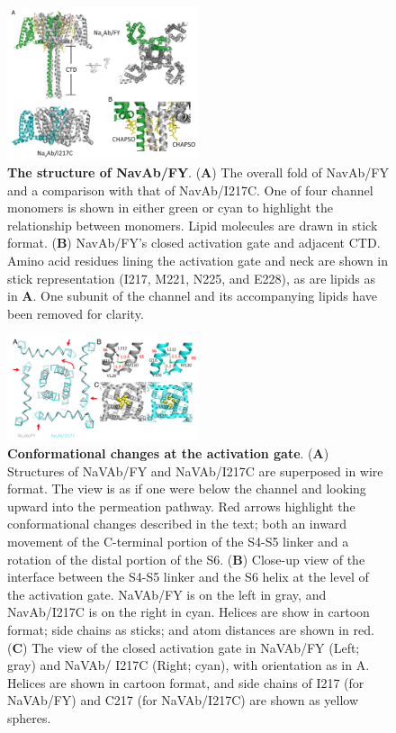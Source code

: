 \begin{refsection}
{\begin{figure}[!htb]
\centering
\includegraphics[width=0.5\textwidth]{navopen/NavOFig2}
\caption[The structure of NavAb/FY]{\textbf{The structure of NavAb/FY}. (\textbf{A})  The overall fold of NavAb/FY and a comparison with that of NavAb/I217C. One of four channel monomers is shown in either green or cyan to highlight the relationship between monomers. Lipid molecules are drawn in stick format. (\textbf{B}) NavAb/FY's closed activation gate and adjacent CTD. Amino acid residues lining the activation gate and neck are shown in stick representation (I217, M221, N225, and E228), as are lipids as in \textbf{A}. One subunit of the channel and its accompanying lipids have been removed for clarity.}
\label{fig:navofig2}
\end{figure}

\begin{figure}[!htb]
\centering
\includegraphics[width=0.5\textwidth]{navopen/NavOFig3}
\caption[Conformational changes at the activation gate]{\textbf{Conformational changes at the activation gate}. (\textbf{A}) Structures of NaVAb/FY and NaVAb/I217C are superposed in wire format. The view is as if one were below the channel and looking upward into the permeation pathway. Red arrows highlight the conformational changes described in the text; both an inward movement of the C-terminal portion of the S4-S5 linker and a rotation of the distal portion of the S6. (\textbf{B}) Close-up view of the interface between the S4-S5 linker and the S6 helix at the level of the activation gate. NaVAb/FY is on the left in gray, and NavAb/I217C is on the right in cyan. Helices are show in cartoon format; side chains as sticks; and atom distances are shown in red. (\textbf{C}) The view of the closed activation gate in NaVAb/FY (Left; gray) and NaVAb/ I217C (Right; cyan), with orientation as in A. Helices are shown in cartoon format, and side chains of I217 (for NaVAb/FY) and C217 (for NaVAb/I217C) are shown as yellow spheres.}
\label{fig:navofig3}
\end{figure}

}
\end{refsection}
